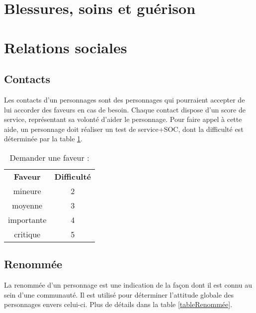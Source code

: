 \documentclass[10pt,a4paper,twocolumn]{book}
\begin{document}
\section{Blessures, soins et guérison}
\section{Relations sociales}
\subsection{Contacts}
Les contacts d’un personnages sont des personnages qui pourraient accepter de lui accorder des faveurs en cas de besoin.
Chaque contact dispose d’un score de service, représentant sa volonté d’aider le personnage.
Pour faire appel à cette aide, un personnage doit réaliser un test de service+SOC, dont la difficulté est déterminée par la table \ref{tableFaveurs}.

\begin{table}
\caption{ Demander une faveur :}
\label{tableFaveurs}
\begin{center}
\begin{tabular}{cc}
\textbf{Faveur} & \textbf{Difficulté} \\
   mineure & 2  \\
   moyenne & 3  \\
   importante & 4 \\
   critique & 5\\
\end{tabular}
\end{center}
\end{table}
\subsection{Renommée}
La renommée d’un personnage est une indication de la façon dont il est connu au sein d’une communauté. Il est utilisé pour déterminer l’attitude globale des personnages envers celui-ci. Plus de détails dans la table \ref{tableRenommée}.
\end{document}
